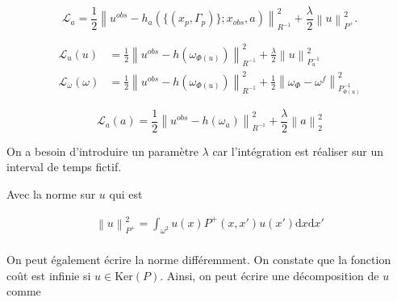 \documentclass{article}
\newcommand{\norm}[1]{\left\lVert #1 \right\rVert}
\begin{document}
\begin{equation*}
    \mathcal L_a =  \frac12 \norm{u^{obs} - h_a(\{(x_p, \Gamma_p)\}; x_{obs}, a)}^2_{R^{-1}} +  \frac{\lambda}{2} \norm{u}^2_{P^+}.
\end{equation*}

\begin{align*}
    \mathcal L_u(u)           & =  \frac12 \norm{u^{obs} - h(\omega_{\Phi(u)})}^2_{R^{-1}} + \frac{\lambda}{2} \norm{u}^2_{P_u^{-1}}                          \\
    \mathcal L_\omega(\omega) & =  \frac12 \norm{u^{obs} - h(\omega_{\Phi(u)})}^2_{R^{-1}} + \frac{1}{2} \norm{\omega_{\Phi} - \omega^f}^2_{P_{\Phi(u)}^{-1}}
\end{align*}

\begin{equation*}
    \mathcal L_a(a)            =  \frac12 \norm{u^{obs} - h(\omega_{a})}^2_{R^{-1}} + \frac{\lambda}{2} \norm{a}^2_2
\end{equation*}

On a besoin d'introduire un paramètre $\lambda$ car l'intégration est réaliser sur un interval de temps fictif.

Avec la norme sur $u$ qui est

\begin{eqnarray*}
    \norm{u}^2_{P^+} = \int_{\omega^2} u(x) P^+(x, x') u(x') \mathrm{d}x\mathrm{d}x' \\
\end{eqnarray*}







On peut également écrire la norme différemment. On constate que la fonction coût est infinie si $u \in \text{Ker} (P)$. Ainsi, on peut écrire une décomposition de $u$ comme
\end{document}
